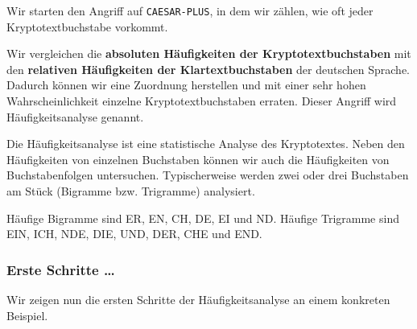 Wir starten den Angriff auf \texttt{CAESAR-PLUS}, in dem wir zählen, wie oft jeder Kryptotextbuchstabe vorkommt.

\begin{definition}[Häufigkeitsanalyse]
Wir vergleichen die \textbf{absoluten Häufigkeiten der Kryptotextbuchstaben} mit den \textbf{relativen Häufigkeiten der Klartextbuchstaben} der deutschen Sprache. Dadurch können wir eine Zuordnung herstellen und mit einer sehr hohen Wahrscheinlichkeit einzelne Kryptotextbuchstaben erraten. Dieser Angriff wird Häufigkeitsanalyse genannt.
\end{definition}

Die Häufigkeitsanalyse ist eine statistische Analyse des Kryptotextes. Neben den Häufigkeiten von einzelnen Buchstaben können wir auch die Häufigkeiten von Buchstabenfolgen untersuchen. Typischerweise werden zwei oder drei Buchstaben am Stück (Bigramme bzw. Trigramme) analysiert.

\begin{example}
Häufige Bigramme sind ER, EN, CH, DE, EI und ND. Häufige Trigramme sind EIN, ICH, NDE, DIE, UND, DER, CHE und END.
\end{example}

\subsubsection{Erste Schritte \dots}

Wir zeigen nun die ersten Schritte der Häufigkeitsanalyse an einem konkreten Beispiel.

